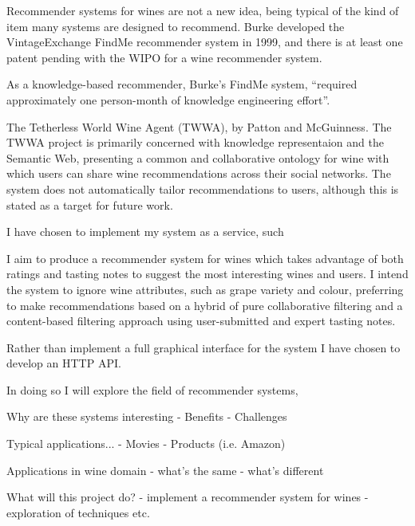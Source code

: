 
Recommender systems for wines are not a new idea, being typical of the kind of item many systems are designed to recommend. Burke developed the VintageExchange FindMe recommender system in 1999\cite{Burke99}, and there is at least one patent pending with the WIPO for a wine recommender system\cite{WIPO12}.

As a knowledge-based recommender, Burke's FindMe system, ``required approximately one person-month of knowledge engineering effort''\cite{Burke99b}.

The Tetherless World Wine Agent (TWWA), by Patton and McGuinness\cite{Patton}. The TWWA project is primarily concerned with knowledge representaion and the Semantic Web, presenting a common and collaborative ontology for wine with which users can share wine recommendations across their social networks\cite{TWWAIndex}. The system does not automatically tailor recommendations to users, although this is stated as a target for future work\cite{TWWAIndex}.


I have chosen to implement my system as a service, such 


I aim to produce a recommender system for wines which takes advantage of both ratings and tasting notes to suggest the most interesting wines and users. I intend the system to ignore wine attributes, such as grape variety and colour, preferring to make recommendations based on a hybrid of pure collaborative filtering and a content-based filtering approach using user-submitted and expert tasting notes.

Rather than implement a full graphical interface for the system I have chosen to develop an HTTP API.

In doing so I will explore the field of recommender systems, 

Why are these systems interesting - Benefits - Challenges

Typical applications...  - Movies - Products (i.e. Amazon)

Applications in wine domain - what's the same - what's different

What will this project do?  - implement a recommender system for wines -
exploration of techniques etc.

